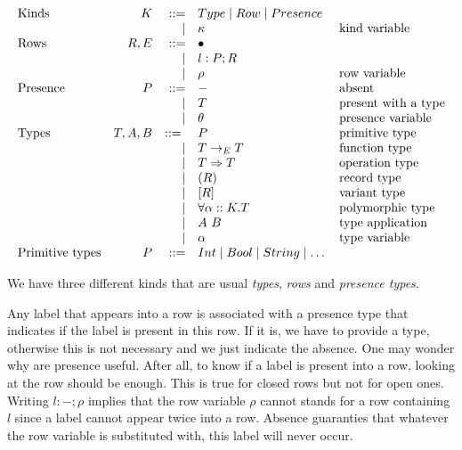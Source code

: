 \documentclass[11pt, nonacm=true, language=french, language=english]{acmart}
\begin{document}
\[
  \begin{array}{lrrll}
    \text{Kinds}           & K & ::= & Type \mid Row \mid Presence & \\
                           &&\mid & \kappa & \text{kind variable} \\

    \text{Rows}            & R, E & ::= & \bullet & \\
                           &&\mid & l:P;R & \\
                           &&\mid & \rho & \text{row variable} \\

    \text{Presence}        & P & ::= & - & \text{absent} \\
                           &&\mid & T & \text{present with a type} \\
                           &&\mid & \theta & \text{presence variable} \\

    \text{Types}           & T, A, B & ::=\ & P & \text{primitive type} \\
                           &&\mid & T \to_{E} T & \text{function type} \\
                           &&\mid & T \Rightarrow T & \text{operation type} \\
                           &&\mid & (R) & \text{record type} \\
                           &&\mid & [R] & \text{variant type} \\
                           &&\mid & \forall \alpha :: K. T & \text{polymorphic type} \\
                           &&\mid & A\ B & \text{type application} \\
                           &&\mid & \alpha & \text{type variable} \\

    \text{Primitive types} & P & ::= & Int \mid Bool \mid String \mid \dots &
  \end{array}
\]

We have three different kinds that are usual \emph{types}, \emph{rows} and \emph{presence types}.

Any label that appears into a row is associated with a presence type that indicates if the label is present in this row. If it is, we have to provide a type, otherwise this is not necessary and we just indicate the absence. One may wonder why are presence useful. After all, to know if a label is present into a row, looking at the row should be enough. This is true for closed rows but not for open ones. Writing $l:-;\rho$ implies that the row variable $\rho$ cannot stands for a row containing $l$ since a label cannot appear twice into a row. Absence guaranties that whatever the row variable is substituted with, this label will never occur.
\end{document}
